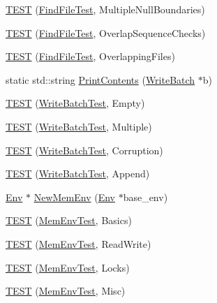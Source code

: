 \begin{DoxyCompactItemize}
\item 
\hyperlink{namespaceleveldb_ac9911f7a50cf3a0d5ddc4533910054a1}{T\-E\-S\-T} (\hyperlink{classleveldb_1_1_find_file_test}{Find\-File\-Test}, Multiple\-Null\-Boundaries)
\item 
\hyperlink{namespaceleveldb_a22fa4bca5e930976bcd623786011a180}{T\-E\-S\-T} (\hyperlink{classleveldb_1_1_find_file_test}{Find\-File\-Test}, Overlap\-Sequence\-Checks)
\item 
\hyperlink{namespaceleveldb_a60968bf0debd7046229d2da8d0a823c3}{T\-E\-S\-T} (\hyperlink{classleveldb_1_1_find_file_test}{Find\-File\-Test}, Overlapping\-Files)
\item 
static std\-::string \hyperlink{namespaceleveldb_a188b9c5674c8e10ff619f01f454faaf6}{Print\-Contents} (\hyperlink{classleveldb_1_1_write_batch}{Write\-Batch} $\ast$b)
\item 
\hyperlink{namespaceleveldb_a77a1389346b24fa9b5f9698400c865f6}{T\-E\-S\-T} (\hyperlink{classleveldb_1_1_write_batch_test}{Write\-Batch\-Test}, Empty)
\item 
\hyperlink{namespaceleveldb_af2029a94a0a17d6eb1bfec4d38b7e3a0}{T\-E\-S\-T} (\hyperlink{classleveldb_1_1_write_batch_test}{Write\-Batch\-Test}, Multiple)
\item 
\hyperlink{namespaceleveldb_a8021231dcd7fd48d082ecf965a2b8230}{T\-E\-S\-T} (\hyperlink{classleveldb_1_1_write_batch_test}{Write\-Batch\-Test}, Corruption)
\item 
\hyperlink{namespaceleveldb_a6b1521832d07ed987bc4ea6c3867bd00}{T\-E\-S\-T} (\hyperlink{classleveldb_1_1_write_batch_test}{Write\-Batch\-Test}, Append)
\item 
\hyperlink{classleveldb_1_1_env}{Env} $\ast$ \hyperlink{namespaceleveldb_a15271a802c68de223ea56b4b26e83519}{New\-Mem\-Env} (\hyperlink{classleveldb_1_1_env}{Env} $\ast$base\-\_\-env)
\item 
\hyperlink{namespaceleveldb_a0bec4396e504d47207110edc4a11f302}{T\-E\-S\-T} (\hyperlink{classleveldb_1_1_mem_env_test}{Mem\-Env\-Test}, Basics)
\item 
\hyperlink{namespaceleveldb_aaee612d19267a7183555aee571cd1415}{T\-E\-S\-T} (\hyperlink{classleveldb_1_1_mem_env_test}{Mem\-Env\-Test}, Read\-Write)
\item 
\hyperlink{namespaceleveldb_ab388329216765ab6e37e34b4ac778991}{T\-E\-S\-T} (\hyperlink{classleveldb_1_1_mem_env_test}{Mem\-Env\-Test}, Locks)
\item 
\hyperlink{namespaceleveldb_a57beb72845ed55c4cc316709f14670da}{T\-E\-S\-T} (\hyperlink{classleveldb_1_1_mem_env_test}{Mem\-Env\-Test}, Misc)

\end{DoxyCompactItemize}
